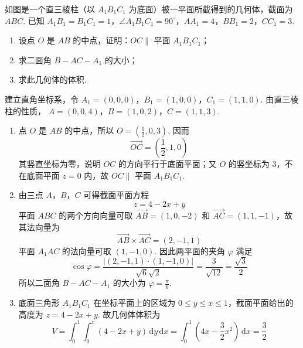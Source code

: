 \begin{problem}
如图是一个直三棱柱（以 \(A_{1}B_{1}C_{1}\) 为底面）被一平面所截得到的几何体，截面为 \(ABC\). 已知 \(A_{1}B_{1} = B_{1}C_{1} = 1\)，\(\angle A_{1}B_{1}C_{1} = 90^{\circ}\)，\(AA_{1} = 4\)，\(BB_{1} = 2\)，\(CC_{1} = 3\).

\begin{enumerate}
\item 设点 \(O\) 是 \(AB\) 的中点，证明：\(OC \parallel\) 平面 \(A_{1}B_{1}C_{1}\)；
\item 求二面角 \(B - AC - A_{1}\) 的大小；
\item 求此几何体的体积.
\end{enumerate}

\end{problem}

\begin{solution}
建立直角坐标系，令
\(A_1=(0,0,0)\)，\(B_1=(1,0,0)\)，\(C_1=(1,1,0)\).
由直三棱柱的性质，
\(A=(0,0,4)\)，\(B=(1,0,2)\)，\(C=(1,1,3)\).
\begin{enumerate}
\item 点 \(O\) 是 \(AB\) 的中点，所以 \(O=\left(\frac12,0,3\right)\). 因而
\[
\overrightarrow{OC}=\left(\frac12,1,0\right)
\]
其竖直坐标为零，说明 \(OC\) 的方向平行于底面平面；又 \(O\) 的竖坐标为 \(3\)，不在底面平面 \(z=0\) 内，故 \(OC\parallel\) 平面 \(A_1B_1C_1\).

\item 由三点 \(A\)，\(B\)，\(C\) 可得截面平面方程
\[
z=4-2x+y
\]
平面 \(ABC\) 的两个方向向量可取 \(\overrightarrow{AB}=(1,0,-2)\) 和 \(\overrightarrow{AC}=(1,1,-1)\)，故其法向量为
\[
\overrightarrow{AB}\times\overrightarrow{AC}=(2,-1,1)
\]
平面 \(A_1AC\) 的法向量可取 \((1,-1,0)\). 因此两平面的夹角 \(\varphi\) 满足
\[
\cos\varphi=\frac{|(2,-1,1)\cdot(1,-1,0)|}{\sqrt6\sqrt2}=\frac{3}{\sqrt{12}}=\frac{\sqrt3}{2}
\]
所以二面角 \(B-AC-A_1\) 的大小为 \(\varphi=\frac\pi6\).

\item 底面三角形 \(A_1B_1C_1\) 在坐标平面上的区域为 \(0\leqslant y\leqslant x\leqslant1\)，截面平面给出的高度为 \(z=4-2x+y\). 故几何体体积为
\[
V=\int_0^1\int_0^x(4-2x+y)\,\mathrm{d}y\,\mathrm{d}x
=\int_0^1\left(4x-\frac32x^2\right)\,\mathrm{d}x
=\frac32
\]
\end{enumerate}
\end{solution}

